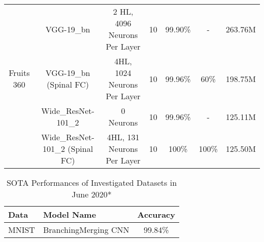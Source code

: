 \documentclass[journal]{IEEEtran}
\begin{document}
\begin{table*}
\begin{tabular}{|c|c|c|c|c|c|c|}
   & VGG-19\_bn & 2 HL, 4096 Neurons Per Layer & 10 & 99.90\%  & - &263.76M\\  \cline{2-7}
  Fruits 360    & VGG-19\_bn (Spinal FC) & 4HL, 1024 Neurons Per Layer & 10 & 99.96\%  & 60\% &198.75M\\  \cline{2-7}
  \cite{Fruits360} & Wide\_ResNet-101\_2 & 0 Neurons & 10 & 99.96\%  & - & 125.11M\\  \cline{2-7}
 & Wide\_ResNet-101\_2 (Spinal FC) &  4HL, 131 Neurons Per Layer &10 &100\% & 100\% &125.50M\\ \hline 


\end{tabular}


\end{table*}


\begin{table}
\centering
\caption{SOTA Performances of Investigated Datasets in June 2020*}
\label{SOTA_TAB}
\begin{tabular}{|l|l|c|}
\hline
 Data&Model Name  & Accuracy    \\ \hline 
 MNIST&BranchingMerging CNN  \cite{byerly2020branching} & 99.84\%   \\ \hline 
 

\end{tabular}
\end{table}
\end{document}
